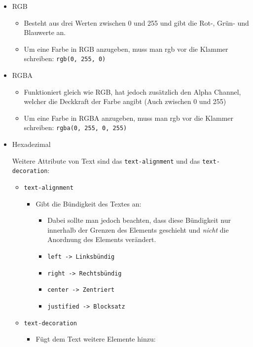 \documentclass{article}
\begin{document}
	\begin{itemize}
		\item{RGB}
		\begin{itemize}
			\item{Besteht aus drei Werten zwischen 0 und 255 und gibt die Rot-, Grün- und Blauwerte an.}
			\item{Um eine Farbe in RGB anzugeben, muss man rgb vor die Klammer schreiben: \texttt{rgb(0, 255, 0)}}
		\end{itemize}
		\item{RGBA}
		\begin{itemize}
			\item{Funktioniert gleich wie RGB, hat jedoch zusätzlich den Alpha Channel, welcher die Deckkraft der Farbe angibt (Auch zwischen 0 und 255)}
			\item{Um eine Farbe in RGBA anzugeben, muss man rgb vor die Klammer schreiben: \texttt{rgba(0, 255, 0, 255)}}
		\end{itemize}
		\item{Hexadezimal}
		Weitere Attribute von Text sind das \texttt{text-alignment} und das \texttt{text-decoration}:
		\begin{itemize}
			\item{\texttt{text-alignment}}
			\begin{itemize}
				\item{Gibt die Bündigkeit des Textes an:}
				\begin{itemize}
					\item{Dabei sollte man jedoch beachten, dass diese Bündigkeit nur innerhalb der Grenzen des Elements geschieht und \textit{nicht} die Anordnung des Elements verändert.}
					\item{\texttt{left -> Linksbündig}}
					\item{\texttt{right -> Rechtsbündig}}
					\item{\texttt{center -> Zentriert}}
					\item{\texttt{justified -> Blocksatz}}
				\end{itemize}
			\end{itemize}
			\item{\texttt{text-decoration}}
			\begin{itemize}
				\item{Fügt dem Text weitere Elemente hinzu:}
			\end{itemize}
		\end{itemize}

\end{itemize}
\end{document}
